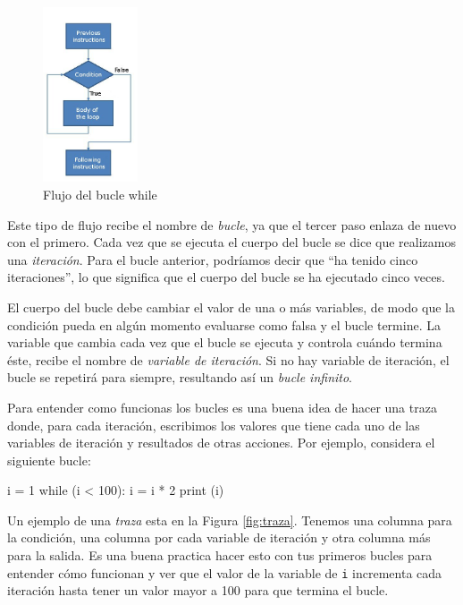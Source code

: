 \begin{figure}[h]
    \centering
    \includegraphics[width=0.25\textwidth]{images/while.jpg}
    \caption{Flujo del bucle while}
    \label{fig:while}
\end{figure}

Este tipo de flujo recibe el nombre de \emph{bucle}, ya que el tercer
paso enlaza de nuevo con el primero. Cada vez que se ejecuta el cuerpo
del bucle se dice que realizamos una \emph{iteración}. Para el bucle
anterior, podríamos decir que ``ha tenido cinco iteraciones'', lo que
significa que el cuerpo del bucle se ha ejecutado cinco veces.

  

El cuerpo del bucle debe cambiar el valor de una o más variables, de
modo que la condición pueda en algún momento evaluarse como falsa y el
bucle termine. La variable que cambia cada vez que el bucle se ejecuta y
controla cuándo termina éste, recibe el nombre de \emph{variable de
iteración}. Si no hay variable de iteración, el bucle se repetirá para
siempre, resultando así un \emph{bucle infinito}.

Para entender como funcionas los bucles es una buena idea de hacer una traza donde, para cada iteración, escribimos los valores que tiene cada uno de las variables de iteración y resultados de otras acciones. Por ejemplo, considera el siguiente bucle:

\begin{python}[frame=single]
i = 1
while (i < 100):
    i = i * 2
    print (i)
\end{python}

Un ejemplo de una \emph{traza} esta en la Figura \ref{fig:traza}. Tenemos una columna para la condición, una columna por cada variable de iteración y otra columna más para la salida. Es una buena practica hacer esto con tus primeros bucles para entender cómo funcionan y ver que el valor de la variable de \verb|i| incrementa cada iteración hasta tener un valor mayor a 100 para que termina el bucle.

